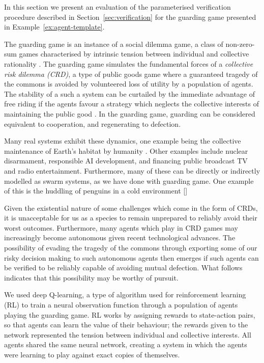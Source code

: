 
In this section we present an evaluation of the parameterised verification
procedure described in Section~\ref{sec:verification} for the guarding game
presented in Example~\ref{ex:agent-template}.


The guarding game is an instance of a social dilemma game, a class of
non-zero-sum games characterised by intrinsic tension between individual and
collective rationality \cite{VanlangeJPV13}. The guarding game simulates the
fundamental forces of a \emph{collective risk dilemma (CRD)}, a type of public
goods game where a guaranteed tragedy of the commons \cite{Hardin68} is avoided
by volunteered loss of utility by a population of agents. The stability of a
such a system can be curtailed by the immediate advantage of free riding if the
agents favour a strategy which neglects the collective interests of maintaining
the public good \cite{SantosP11}. In the guarding game, guarding can be
considered equivalent to cooperation, and regenerating to defection.

Many real systems exhibit these dynamics, one example being the collective
maintenance of Earth's habitat by humanity \cite{Smirnov19}. Other examples
include nuclear disarmament, responsible AI development, and financing public
broadcast TV and radio entertainment. Furthermore, many of these can be
directly or indirectly modelled as swarm systems, as we have done with guarding
game. One example of this is the huddling of penguins in a cold environment
[]

Given the existential nature of some challenges which come in the form of CRDs,
it is unacceptable for us as a species to remain unprepared to reliably avoid
their worst outcomes. Furthermore, many agents which play in CRD games may
increasingly become autonomous given recent technological advances. The
possibility of evading the tragedy of the commons through exporting some of our
risky decision making to such autonomous agents then emerges if such agents can
be verified to be reliably capable of avoiding mutual defection. What follows
indicates that this possibility may be worthy of pursuit.

We used deep Q-learning, a type of algorithm used for reinforcement learning (RL) to train a neural observation function through a population of agents playing the guarding game. RL works by assigning rewards to state-action pairs, so that agents can learn the value of their behaviour; the rewards given to the network represented the tension between individual and collective interests. All agents shared the same neural network, creating a system in which the agents were learning to play against exact copies of themselves. 

